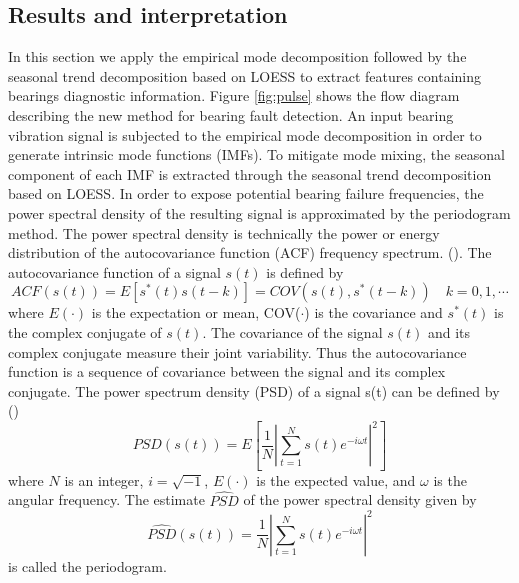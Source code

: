 \documentclass[../Main/thesis.tex]{subfiles}
\begin{document}
\subsection{Results and interpretation}
In this section we apply the empirical mode decomposition followed by the seasonal trend decomposition based on LOESS to extract features containing bearings diagnostic information.
Figure \ref{fig:pulse} shows the flow diagram describing the new method for bearing fault detection.
\justify
An input bearing vibration signal is subjected to the empirical mode decomposition in order to generate intrinsic mode functions (IMFs). To mitigate mode mixing, the seasonal component of each IMF is extracted through the seasonal trend decomposition based on LOESS. In order to expose potential bearing failure frequencies, the power spectral density of the resulting signal is approximated by the periodogram method.
\justify
The power spectral density is technically the power or energy distribution of the autocovariance function (ACF) frequency spectrum. (\cite{stoica2004}). The autocovariance function of a signal $s(t)$ is defined by 
\begin{equation}
	ACF(s(t)) = E\left[ s^{*}(t)s(t-k) \right] = COV\left(s(t), s^{*}(t-k)\right)\quad k = 0,1, \cdots
\end{equation}
where $E(\cdot)$ is the expectation or mean, COV($\cdot$) is the covariance and $s^{*}(t)$ is the complex conjugate of $s(t)$. The covariance of the signal $s(t)$ and its complex conjugate measure their joint variability. Thus the autocovariance function is a sequence of covariance between the signal and its complex conjugate. The power spectrum density (PSD) of a signal s(t) can be defined by (\cite{stoica2004})
\begin{equation}\label{eq:psd}
	PSD\left(s(t)\right) = E\left[ \frac{1}{N} \left\vert \sum_{t=1}^{N} s(t)e^{-i\omega t}\right\vert^{2}   \right]
\end{equation}
where $N$ is an integer, $i=\sqrt{-1}$, $E(\cdot)$ is the expected value, and $\omega$ is the angular frequency. The estimate $\widehat{PSD}$ of the power spectral density given by
\begin{equation}
		\widehat{PSD}\left(s(t)\right) =  \frac{1}{N} \left\vert \sum_{t=1}^{N} s(t)e^{-i\omega t}\right\vert^{2}
\end{equation}
is called the periodogram.
\end{document}
